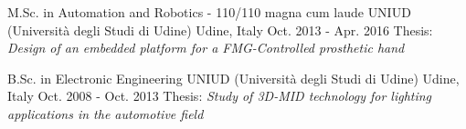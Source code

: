 
\begin{cventries}

	\cventry
	{M.Sc. in Automation and Robotics - 110/110 magna cum laude}
	{UNIUD (Università degli Studi di Udine)}
	{Udine, Italy}
	{Oct. 2013 - Apr. 2016}
	{
		Thesis: \emph{Design of an embedded platform for a FMG-Controlled prosthetic hand}
	}

	\cventry
	{B.Sc. in Electronic Engineering}
	{UNIUD (Università degli Studi di Udine)}
	{Udine, Italy}
	{Oct. 2008 - Oct. 2013}
	{
		Thesis: \emph{Study of 3D-MID technology for lighting applications in the automotive field}
	}


\end{cventries}
